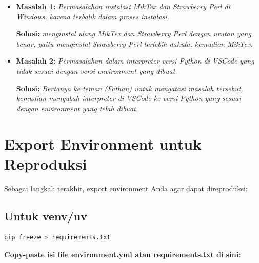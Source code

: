 \documentclass[11pt,a4paper]{article}
\begin{document}
\begin{itemize}
    \item \textbf{Masalah 1:} \textit{Permasalahan instalasi MikTex dan Strawberry Perl di Windows, karena terbalik dalam proses instalasi.}
    
    \textbf{Solusi:} \textit{menginstal ulang MikTex dan Strawberry Perl dengan urutan yang benar, yaitu menginstal Strawberry Perl terlebih dahulu, kemudian MikTex.}

    \item \textbf{Masalah 2:} \textit{Permasalahan dalam interpreter versi Python di VSCode yang tidak sesuai dengan versi environment yang dibuat.}
    
    \textbf{Solusi:} \textit{Bertanya ke teman (Fathan) untuk mengatasi masalah tersebut, kemudian mengubah interpreter di VSCode ke versi Python yang sesuai dengan environment yang telah dibuat.}
\end{itemize}

\section{Export Environment untuk Reproduksi}
Sebagai langkah terakhir, export environment Anda agar dapat direproduksi:

\subsection{Untuk venv/uv}
\begin{lstlisting}[language=bash, caption=Export pip requirements]
pip freeze > requirements.txt
\end{lstlisting}

\textbf{Copy-paste isi file environment.yml atau requirements.txt di sini:}
\end{document}
